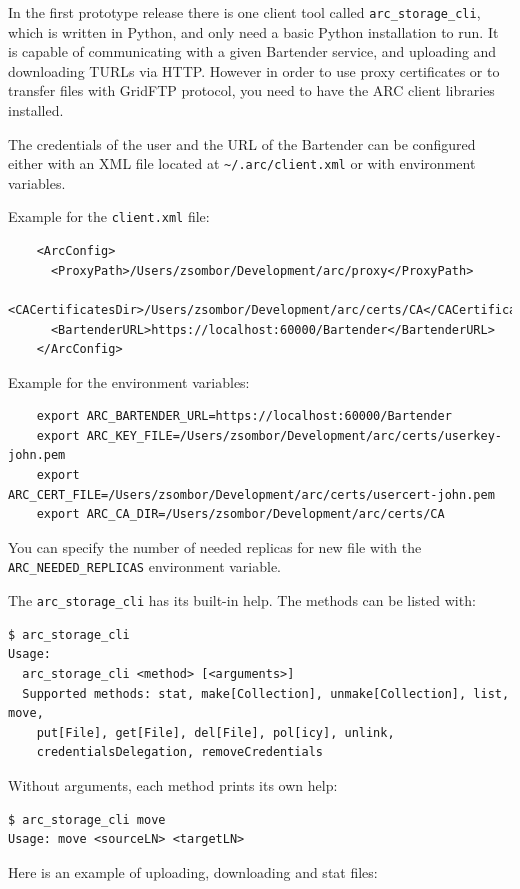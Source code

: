 \documentclass{book}
\begin{document}
In the first prototype release there is one client tool called \verb!arc_storage_cli!, which is written in Python, and only need a basic Python installation to run. It is capable of communicating with a given Bartender service, and uploading and downloading TURLs via HTTP. However in order to use proxy certificates or to transfer files with GridFTP protocol, you need to have the ARC client libraries installed.

The credentials of the user and the URL of the Bartender can be configured either with an XML file located at \verb!~/.arc/client.xml! or with environment variables.

Example for the \verb!client.xml! file:

\begin{verbatim}
    <ArcConfig>
      <ProxyPath>/Users/zsombor/Development/arc/proxy</ProxyPath>
      <CACertificatesDir>/Users/zsombor/Development/arc/certs/CA</CACertificatesDir>
      <BartenderURL>https://localhost:60000/Bartender</BartenderURL>
    </ArcConfig>
\end{verbatim}

Example for the environment variables:

\begin{verbatim}
    export ARC_BARTENDER_URL=https://localhost:60000/Bartender
    export ARC_KEY_FILE=/Users/zsombor/Development/arc/certs/userkey-john.pem
    export ARC_CERT_FILE=/Users/zsombor/Development/arc/certs/usercert-john.pem 
    export ARC_CA_DIR=/Users/zsombor/Development/arc/certs/CA    
\end{verbatim}

You can specify the number of needed replicas for new file with the \verb!ARC_NEEDED_REPLICAS! environment variable.

The \verb!arc_storage_cli! has its built-in help. The methods can be listed with:

\begin{verbatim}
$ arc_storage_cli
Usage:
  arc_storage_cli <method> [<arguments>]
  Supported methods: stat, make[Collection], unmake[Collection], list, move,
    put[File], get[File], del[File], pol[icy], unlink,
    credentialsDelegation, removeCredentials
\end{verbatim}
Without arguments, each method prints its own help:
\begin{verbatim}
$ arc_storage_cli move
Usage: move <sourceLN> <targetLN>
\end{verbatim}

Here is an example of uploading, downloading and stat files:
\end{document}
